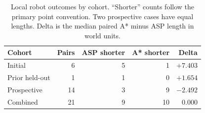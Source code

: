 \begin{table}[H]
\caption{Local robot outcomes by cohort. ``Shorter'' counts follow the primary point convention. Two prospective cases have equal lengths. Delta is the median paired A* minus ASP length in world units.}\label{tab:robot}
\centering\begin{tabular}{lrrrr}\toprule
Cohort &Pairs&ASP shorter&A* shorter&Delta\\\midrule
Initial &6&5&1&$+7.403$\\
Prior held-out &1&1&0&$+1.654$\\
Prospective &14&3&9&$-2.492$\\\midrule
Combined &21&9&10&$0.000$\\\bottomrule
\end{tabular}
\end{table}

